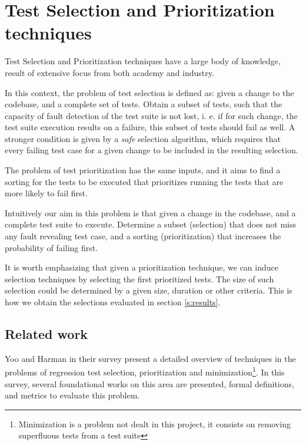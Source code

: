 \section{Test Selection and Prioritization techniques}\label{s:tsp-tech}

Test Selection and Prioritization techniques have a large body of knowledge,
result of extensive focus from both academy and industry.

In this context, the problem of test selection is defined as: given a change
to the codebase, and a complete set of tests. Obtain a subset of tests,
such that the capacity of fault detection of the test suite is not lost, i. e.
if for such change, the test suite execution results on a failure, this subset
of tests should fail as well. A stronger condition is given by a \emph{safe} 
selection algorithm, which requires that every failing test case for a given 
change to be included in the resulting selection.

The problem of test prioritization has the same inputs, and it aims to find a
sorting for the tests to be executed that prioritizes running the tests that
are more likely to fail first.

Intuitively our aim in this problem is that given a change in the codebase,
and a complete test suite to execute. Determine a subset (selection) that
does not miss any fault revealing test case, and a sorting (prioritization)
that increases the probability of failing first.

It is worth emphasizing that given a prioritization technique, we can induce
selection techniques by selecting the first prioritized tests. The size of
such selection could be determined by a given size, duration or other criteria.
This is how we obtain the selections evaluated in section \ref{s:results}.

\subsection{Related work}
\label{sec:bg-tsp-related-work}

Yoo and Harman in their survey \cite{Yoo2012RegressionTM} present a detailed overview of techniques in the problems of
regression test selection, prioritization and minimization\footnote{Minimization is a problem not dealt in this project, it consists on removing superfluous tests from a test suite}.
 In this survey, several foundational works on this area are presented, formal definitions, and metrics to evaluate this problem.

